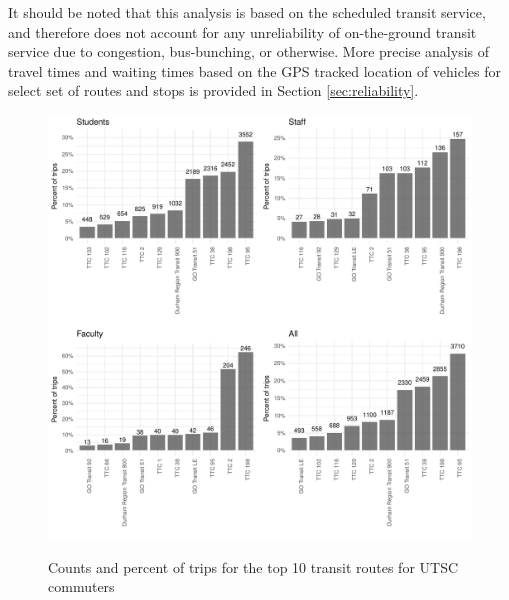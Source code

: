 \documentclass{article}
\begin{document}
		It should be noted that this analysis is based on the scheduled transit service, and therefore does not account for any unreliability of on-the-ground transit service due to congestion, bus-bunching, or otherwise. More precise analysis of travel times and waiting times  based on the GPS tracked location of vehicles for select set of routes and stops is provided in Section \ref{sec:reliability}. 
		
		
		\begin{figure}[H]
			\caption{Counts and percent of trips for the top 10 transit routes for UTSC commuters}
			\centering
			
			\hspace*{-23mm}
			\includegraphics[width=6.5in]{figures/top_routes.pdf}
			\label{fig:toproutes}
		\end{figure}
	
\end{document}
